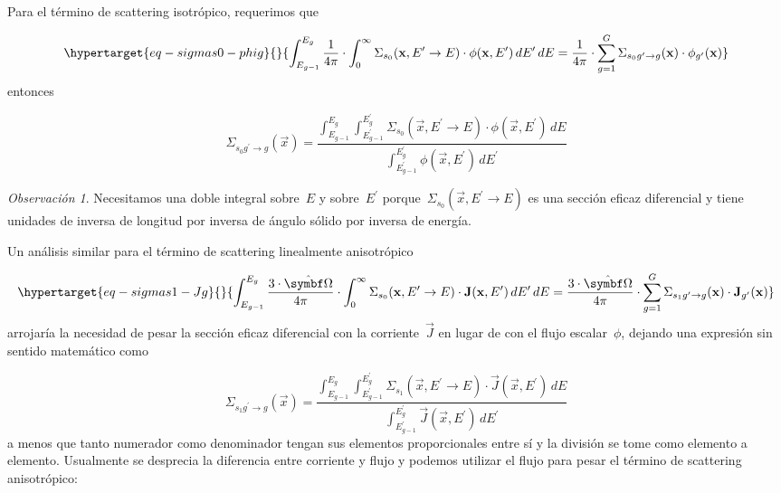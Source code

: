 \documentclass[
  12pt,
  a4paper,
  table]{scrbook}
\theoremstyle{plain}
\theoremstyle{definition}
\theoremstyle{plain}
\theoremstyle{plain}
\theoremstyle{remark}
\newtheorem*{remark}{Observación}
\begin{document}
Para el término de \foreignlanguage{american}{scattering} isotrópico,
requerimos que

\begin{equation}\protect\hypertarget{eq-sigmas0-phig}{}{
\int_{E_{g-1}}^{E_g} \frac{1}{4\pi} \cdot 
\int_{0}^{\infty} \Sigma_{s_0}(\vec{x}, E^{\prime} \rightarrow E) \cdot \phi(\vec{x},E^\prime) \, dE^\prime \, dE
=
\frac{1}{4\pi} \cdot \sum_{g=1}^G \Sigma_{s_0 g^\prime \rightarrow g}(\vec{x}) \cdot \phi_{g^\prime}(\vec{x})
}\label{eq-sigmas0-phig}\end{equation} entonces

\[
\Sigma_{s_0 g^\prime \rightarrow g}(\vec{x}) =
\frac{\displaystyle \int_{E_{g-1}}^{E_g} \int_{E^\prime_{g-1}}^{E^\prime_g} \Sigma_{s_0}(\vec{x}, E^{\prime} \rightarrow E) \cdot \phi(\vec{x},E^\prime) \,dE}{\displaystyle \int_{E^\prime_{g-1}}^{E^\prime_g} \phi(\vec{x},E^\prime) \, dE^\prime}
\]

\begin{remark}

Necesitamos una doble integral sobre~\(E\) y sobre~\(E^\prime\)
porque~\(\Sigma_{s_0}(\vec{x}, E^{\prime} \rightarrow E)\) es una
sección eficaz diferencial y tiene unidades de inversa de longitud por
inversa de ángulo sólido por inversa de energía.

\end{remark}

Un análisis similar para el término de
\foreignlanguage{american}{scattering} linealmente anisotrópico

\begin{equation}\protect\hypertarget{eq-sigmas1-Jg}{}{
\int_{E_{g-1}}^{E_g} \frac{3 \cdot \omegaversor}{4\pi} \cdot 
\int_{0}^{\infty} \Sigma_{s_0}(\vec{x}, E^{\prime} \rightarrow E) \cdot \vec{J}(\vec{x},E^\prime) \, dE^\prime \, dE
=
\frac{3 \cdot \omegaversor}{4\pi} \cdot \sum_{g=1}^G \Sigma_{s_1 g^\prime \rightarrow g}(\vec{x}) \cdot \vec{J}_{g^\prime}(\vec{x})
}\label{eq-sigmas1-Jg}\end{equation} arrojaría la necesidad de pesar la
sección eficaz diferencial con la corriente~\(\vec{J}\) en lugar de con
el flujo escalar~\(\phi\), dejando una expresión sin sentido matemático
como

\[
\Sigma_{s_1 g^\prime \rightarrow g}(\vec{x}) =
\frac{\displaystyle \int_{E_{g-1}}^{E_g} \int_{E^\prime_{g-1}}^{E^\prime_g} \Sigma_{s_1}(\vec{x}, E^{\prime} \rightarrow E) \cdot \vec{J}(\vec{x},E^\prime) \,dE}{\displaystyle \int_{E^\prime_{g-1}}^{E^\prime_g} \vec{J}(\vec{x},E^\prime) \, dE^\prime}
\] a menos que tanto numerador como denominador tengan sus elementos
proporcionales entre sí y la división se tome como elemento a elemento.
Usualmente se desprecia la diferencia entre corriente y flujo y podemos
utilizar el flujo para pesar el término de
\foreignlanguage{american}{scattering} anisotrópico:
\end{document}
